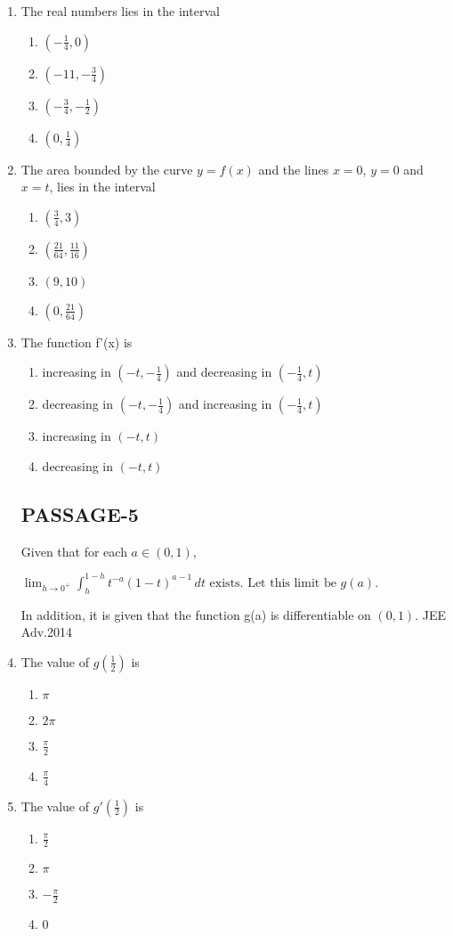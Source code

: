 \documentclass[journal,12pt,twocolumn]{IEEEtran}
\theoremstyle{remark}
\begin{document}
\begin{enumerate}
\item The real numbers lies in the interval
\begin{enumerate}
    \item $(-\frac{1}{4},0)$
    \item $(-11,-\frac{3}{4})$
    \item $(-\frac{3}{4},-\frac{1}{2})$
     \item $(0,\frac{1}{4})$
\end{enumerate}
\item The area bounded by the curve $y=f(x)$ and the lines $x=0$, $y=0$ 
 and $x=t$, lies in the interval
\begin{enumerate}
\item $(\frac{3}{4},3)$ 
\item $(\frac{21}{64},\frac{11}{16})$ 
\item $(9,10)$  
\item $(0,\frac{21}{64})$ 
\end{enumerate}
\item The function f'(x) is
\begin{enumerate}
    \item increasing in $(-t,-\frac{1}{4})$ and decreasing in $(-\frac{1}{4},t)$ 
    \item decreasing in $(-t,-\frac{1}{4})$ and increasing in $(-\frac{1}{4},t)$ 
    \item increasing in $(-t,t)$ 
    \item decreasing in $(-t,t)$
\end{enumerate}
\subsection{PASSAGE-5}

Given that for each $a \in (0, 1)$,

$\lim_{h \to 0^+} \int_h^{1-h} t^{-a} (1-t)^{a-1} \, dt \text{ exists. Let this limit be } g(a).$

In addition, it is given that the function g(a) is differentiable on $(0, 1)$. 
\hfill{JEE Adv.2014} 
    \item The value of $g(\frac{1}{2})$ is
    \begin{enumerate}
        \item $\pi$
        \item $2\pi$
        \item $\frac{\pi}{2}$
        \item $\frac{\pi}{4}$
    \end{enumerate}
    \item The value of $g'(\frac{1}{2})$ is
    \begin{enumerate}
        \item$\frac{\pi}{2}$
        \item${\pi} $
        \item $-\frac{\pi}{2}$
        \item 0
\end{enumerate}
\end{enumerate}
\end{document}
